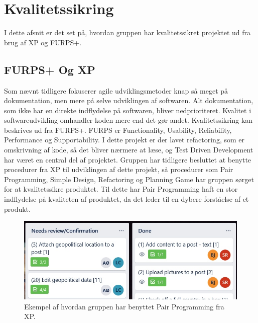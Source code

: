 \chapter{Kvalitetssikring}\label{ch:Kvalitetssikring}

I dette afsnit er det set på, hvordan gruppen har kvalitetssikret projektet ud fra brug af XP og FURPS+. 




\section{FURPS+ Og XP}


Som nævnt tidligere fokuserer agile udviklingsmetoder knap så meget på dokumentation, men mere på selve udviklingen af softwaren. Alt dokumentation, som ikke har en direkte indflydelse på softwaren, bliver nedprioriteret. Kvalitet i softwareudvikling omhandler koden mere end det gør andet. Kvalitetssikring kan beskrives ud fra FURPS+\cite{furps}. FURPS er Functionality, Usability, Reliability, Performance og Supportability. I dette projekt er der lavet refactoring, som er omskrivning af kode, så det bliver nærmere at læse, og Test Driven Development har været en central del af projektet. Gruppen har tidligere besluttet at benytte procedurer fra XP til udviklingen af dette projekt, så procedurer som Pair Programming, Simple Design, Refactoring og Planning Game har gruppen sørget for at kvalitetssikre produktet. Til dette har Pair Programming haft en stor indflydelse på kvaliteten af produktet, da det leder til en dybere forståelse af et produkt. \cite{Sommerville}


\begin{figure}
    \includegraphics[width=\linewidth]{figures/pairprogramming.jpg}
    \caption{Ekempel af hvordan gruppen har benyttet Pair Programming fra XP.}
    \label{fig:Pair}
\end{figure}



